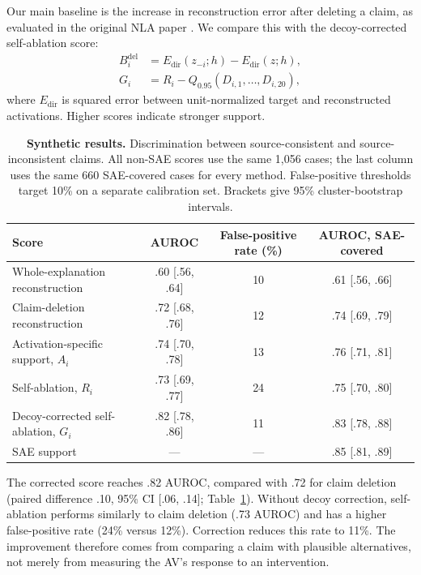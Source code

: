 Our main baseline is the increase in reconstruction error after deleting a
claim, as evaluated in the original NLA paper \citep{frasertaliente2026nla}.
We compare this with the decoy-corrected self-ablation score:
\begin{equation}
\begin{aligned}
B_i^{\mathrm{del}} &= E_{\mathrm{dir}}(z_{-i};h)-E_{\mathrm{dir}}(z;h),\\
G_i &= R_i-Q_{0.95}(D_{i,1},\ldots,D_{i,20}),
\end{aligned}
\end{equation}
where $E_{\mathrm{dir}}$ is squared error between unit-normalized target and
reconstructed activations. Higher scores indicate stronger support.

\begin{table}[t]
\centering\small
\setlength{\tabcolsep}{7pt}
\begin{tabular}{lccc}
\hline
Score & AUROC & False-positive rate (\%) & AUROC, SAE-covered \\
\hline
Whole-explanation reconstruction & .60 [.56, .64] & 10 & .61 [.56, .66] \\
Claim-deletion reconstruction & .72 [.68, .76] & 12 & .74 [.69, .79] \\
Activation-specific support, $A_i$ & .74 [.70, .78] & 13 & .76 [.71, .81] \\
Self-ablation, $R_i$ & .73 [.69, .77] & 24 & .75 [.70, .80] \\
Decoy-corrected self-ablation, $G_i$ & .82 [.78, .86] & 11 & .83 [.78, .88] \\
SAE support & --- & --- & .85 [.81, .89] \\
\hline
\end{tabular}
\caption{\textbf{Synthetic results.} Discrimination between source-consistent
and source-inconsistent claims. All non-SAE scores use the same 1,056 cases;
the last column uses the same 660 SAE-covered cases for every method.
False-positive thresholds target 10\% on a separate calibration set.
Brackets give 95\% cluster-bootstrap intervals.}
\label{tab:grounding-baselines}
\end{table}

The corrected score reaches .82 AUROC, compared with .72 for claim deletion
(paired difference .10, 95\% CI [.06, .14]; Table~\ref{tab:grounding-baselines}).
Without decoy correction, self-ablation performs similarly to claim deletion
(.73 AUROC) and has a higher false-positive rate (24\% versus 12\%). Correction
reduces this rate to 11\%. The improvement therefore comes from comparing a
claim with plausible alternatives, not merely from measuring the AV's response
to an intervention.

